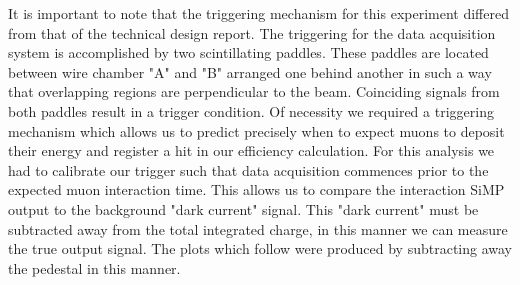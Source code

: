 \documentclass[review]{elsarticle}
\begin{document}
It is important to note that the triggering mechanism for this experiment differed from that of the technical design report. 
The triggering for the data acquisition system is accomplished by two scintillating paddles. 
These paddles are located between wire chamber "A" and "B" arranged one behind another in such a way that overlapping regions are perpendicular to the beam. 
Coinciding signals from both paddles result in a trigger condition. 
Of necessity we required a triggering mechanism which allows us to predict precisely when to expect muons to deposit their energy and register a hit in our efficiency calculation. 
For this analysis we had to calibrate our trigger such that data acquisition commences prior to the expected muon interaction time. 
This allows us to compare the interaction SiMP output to the background "dark current" signal. 
This "dark current" must be subtracted away from the total integrated charge, in this manner we can measure the true output signal. 
The plots which follow were produced by subtracting away the pedestal in this manner. 
\end{document}
